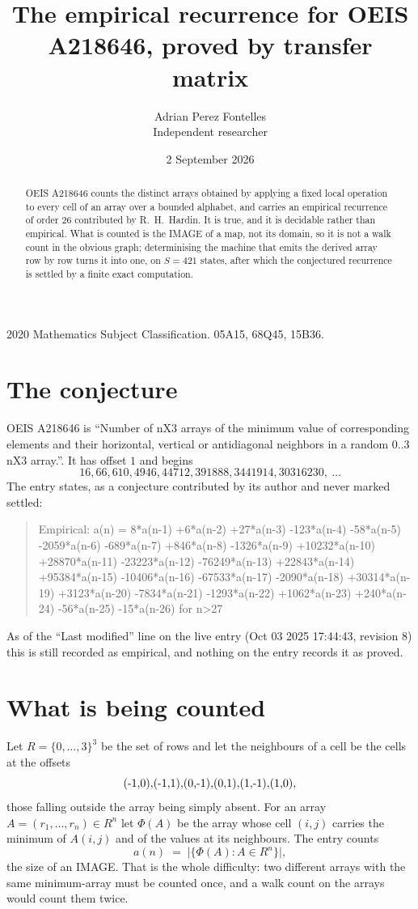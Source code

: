 \documentclass[11pt,a4paper]{article}
\title{The empirical recurrence for OEIS A218646, proved by transfer matrix}
\author{Adrian Perez Fontelles\\ \small Independent researcher}
\date{2 September 2026}
\theoremstyle{plain}
\theoremstyle{definition}
\begin{document}
\maketitle

\begin{abstract}
OEIS A218646 counts the distinct arrays obtained by applying a fixed local operation to every cell
of an array over a bounded alphabet, and carries an empirical recurrence of order $26$
contributed by R.~H.~Hardin. It is true, and it is decidable rather than empirical. What is
counted is the IMAGE of a map, not its domain, so it is not a walk count in the obvious graph;
determinising the machine that emits the derived array row by row turns it into one, on
$S=421$ states, after which the conjectured recurrence is settled by a finite exact
computation.
\end{abstract}

\noindent\small 2020 Mathematics Subject Classification. 05A15, 68Q45, 15B36.\normalsize

\section{The conjecture}

OEIS A218646 is ``Number of nX3 arrays of the minimum value of corresponding elements and their horizontal, vertical or antidiagonal neighbors in a random 0..3 nX3 array.''. It has offset $1$ and begins
\[
16, 66, 610, 4946, 44712, 391888, 3441914, 30316230,\ \dots
\]
The entry states, as a conjecture contributed by its author and never marked settled:
\begin{quote}
Empirical: a(n) = 8*a(n-1) +6*a(n-2) +27*a(n-3) -123*a(n-4) -58*a(n-5) -2059*a(n-6) -689*a(n-7) +846*a(n-8) -1326*a(n-9) +10232*a(n-10) +28870*a(n-11) -23223*a(n-12) -76249*a(n-13) +22843*a(n-14) +95384*a(n-15) -10406*a(n-16) -67533*a(n-17) -2090*a(n-18) +30314*a(n-19) +3123*a(n-20) -7834*a(n-21) -1293*a(n-22) +1062*a(n-23) +240*a(n-24) -56*a(n-25) -15*a(n-26) for n>27
\end{quote}
As of the ``Last modified'' line on the live entry (Oct 03 2025 17:44:43, revision 8) this is still
recorded as empirical, and nothing on the entry records it as proved.

\section{What is being counted}

Let $R=\{0,\dots,3\}^{3}$ be the set of rows and let the neighbours of
a cell be the cells at the offsets
\[
$(-1,0)$, $(-1,1)$, $(0,-1)$, $(0,1)$, $(1,-1)$, $(1,0)$,
\]
those falling outside the array being simply absent. For an array
$A=(r_1,\dots,r_n)\in R^n$ let $\Phi(A)$ be the array whose cell $(i,j)$ carries the
minimum of $A(i,j)$ and of the values at its neighbours. The entry counts
\[
a(n)\;=\;\bigl|\{\Phi(A):A\in R^n\}\bigr| ,
\]
the size of an IMAGE. That is the whole difficulty: two different arrays with the same
minimum-array must be counted once, and a walk count on the arrays would count them twice.
\end{document}
